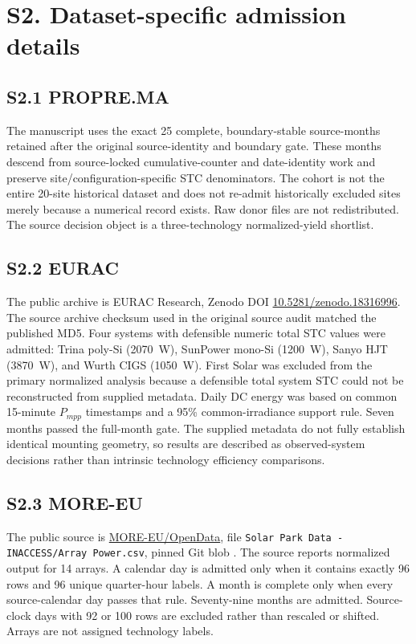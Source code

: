 \documentclass[11pt]{article}
\begin{document}
\section*{S2. Dataset-specific admission details}
\subsection*{S2.1 PROPRE.MA}
The manuscript uses the exact 25 complete, boundary-stable source-months retained after the original source-identity and boundary gate. These months descend from source-locked cumulative-counter and date-identity work and preserve site/configuration-specific STC denominators. The cohort is not the entire 20-site historical dataset and does not re-admit historically excluded sites merely because a numerical record exists. Raw donor files are not redistributed. The source decision object is a three-technology normalized-yield shortlist.

\subsection*{S2.2 EURAC}
The public archive is EURAC Research, Zenodo DOI \href{https://doi.org/10.5281/zenodo.18316996}{10.5281/zenodo.18316996}. The source archive checksum used in the original source audit matched the published MD5. Four systems with defensible numeric total STC values were admitted: Trina poly-Si (2070~W), SunPower mono-Si (1200~W), Sanyo HJT (3870~W), and Wurth CIGS (1050~W). First Solar was excluded from the primary normalized analysis because a defensible total system STC could not be reconstructed from supplied metadata. Daily DC energy was based on common 15-minute $P_{mpp}$ timestamps and a 95\% common-irradiance support rule. Seven months passed the full-month gate. The supplied metadata do not fully establish identical mounting geometry, so results are described as observed-system decisions rather than intrinsic technology efficiency comparisons.

\subsection*{S2.3 MORE-EU}
The public source is \href{https://github.com/MORE-EU/OpenData}{MORE-EU/OpenData}, file \texttt{Solar Park Data -INACCESS/Array Power.csv}, pinned Git blob \texttt{}. The source reports normalized output for 14 arrays. A calendar day is admitted only when it contains exactly 96 rows and 96 unique quarter-hour labels. A month is complete only when every source-calendar day passes that rule. Seventy-nine months are admitted. Source-clock days with 92 or 100 rows are excluded rather than rescaled or shifted. Arrays are not assigned technology labels.
\end{document}
